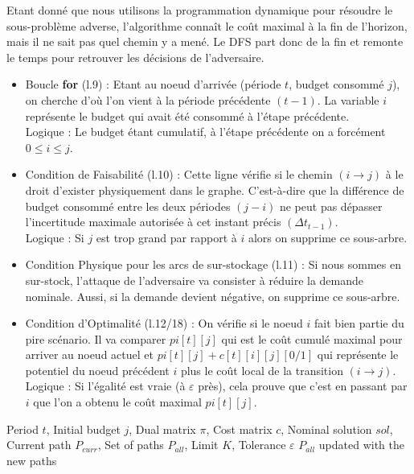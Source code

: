 \documentclass[12pt, a4paper, twoside]{report}
\numberwithin{equation}{section}
\renewcommand{\epsilon}{\varepsilon}
\begin{document}
\begin{Figure}[H]
	Etant donné que nous utilisons la programmation dynamique pour résoudre le sous-problème adverse, l'algorithme connaît le coût maximal à la fin de l'horizon, mais il ne sait pas quel chemin y a mené. Le DFS part donc de la fin et remonte le temps pour retrouver les décisions de l'adversaire. 
	
	\begin{itemize}VOIR COMMENT PLACER ET SI PLACER CA
		\item Boucle \textbf{for} (l.9) : Etant au noeud d'arrivée (période $t$, budget consommé $j$), on cherche d'où l'on vient à la période précédente $(t-1)$. La variable $i$ représente le budget qui avait été consommé à l'étape précédente.\\
		Logique : Le budget étant cumulatif, à l'étape précédente on a forcément $0\leq i\leq j$.
		\item Condition de Faisabilité (l.10) : Cette ligne vérifie si le chemin $(i\rightarrow j)$ à le droit d'exister physiquement dans le graphe. C'est-à-dire que la différence de budget consommé entre les deux périodes $(j-i)$ ne peut pas dépasser l'incertitude maximale autorisée à cet instant précis $(\Delta t_{t-1})$.\\
		Logique : Si $j$ est trop grand par rapport à $i$ alors on supprime ce sous-arbre.
		\item Condition Physique pour les arcs de sur-stockage (l.11) : Si nous sommes en sur-stock, l'attaque de l'adversaire va consister à réduire la demande nominale. Aussi, si la demande devient négative, on supprime ce sous-arbre.
		\item Condition d'Optimalité (l.12/18) : On vérifie si le noeud $i$ fait bien partie  du pire scénario. Il va comparer $pi[t][j]$ qui est le coût cumulé maximal pour arriver au noeud actuel et $pi[t][j] + c[t][i][j][0/1]$ qui représente le potentiel du noeud précédent $i$ plus le coût local de la transition $(i\rightarrow j)$.\\
		Logique : Si l'égalité est vraie (à $\epsilon$ près), cela prouve que c'est en passant par $i$ que l'on a obtenu le coût maximal $pi[t][j]$.
	\end{itemize}
	
	\begin{algorithm}[H]
		\caption{Recursive extraction of worst-case scenarios (DFS)}
		\label{alg:dfs_extraction}
		\begin{algorithmic}[1]
			\Require Period $t$, Initial budget $j$, Dual matrix $\pi$, Cost matrix $c$, Nominal solution $sol$, Current path $P_{curr}$, Set of paths $P_{all}$, Limit $K$, Tolerance $\epsilon$
			\Ensure $P_{all}$ updated with the new paths
			

\end{algorithmic}
\end{algorithm}
\end{Figure}
\end{document}
